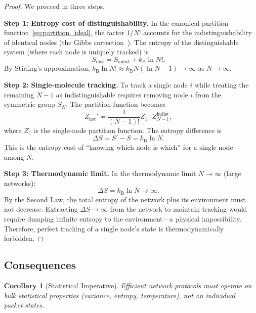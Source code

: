 \documentclass[11pt,twocolumn,a4paper]{article}
\newtheorem{corollary}[theorem]{Corollary}
\theoremstyle{definition}
\theoremstyle{remark}
\newcommand{\kB}{k_{\mathrm{B}}}
\newcommand{\Znet}{Z_{\mathrm{net}}}
\begin{document}
\begin{proof}
We proceed in three steps.

\medskip\noindent\textbf{Step 1: Entropy cost of distinguishability.}
In the canonical partition function~\eqref{eq:partition_ideal}, the factor
$1/N!$ accounts for the indistinguishability of identical nodes (the Gibbs
correction~\cite{Gibbs1902}).  The entropy of the distinguishable system
(where each node is uniquely tracked) is
\begin{equation}\label{eq:s_dist}
  S_{\mathrm{dist}} = S_{\mathrm{indist}} + \kB\ln N!.
\end{equation}
By Stirling's approximation,
$\kB\ln N!\approx\kB N(\ln N-1)\to\infty$ as $N\to\infty$.

\medskip\noindent\textbf{Step 2: Single-molecule tracking.}
To track a single node $i$ while treating the remaining $N-1$ as
indistinguishable requires removing node $i$ from the symmetric group
$S_N$.  The partition function becomes
\[
  \Znet' = \frac{1}{(N-1)!}Z_1\cdot Z_{N-1}^{\mathrm{indist}},
\]
where $Z_1$ is the single-node partition function.  The entropy difference is
\begin{equation}\label{eq:delta_s}
  \Delta S = S'-S = \kB\ln N.
\end{equation}
This is the entropy cost of ``knowing which node is which'' for a single node
among $N$.

\medskip\noindent\textbf{Step 3: Thermodynamic limit.}
In the thermodynamic limit $N\to\infty$ (large networks):
\[
  \Delta S = \kB\ln N \to \infty.
\]
By the Second Law, the total entropy of the network plus its environment
must not decrease.  Extracting $\Delta S\to\infty$ from the network to
maintain tracking would require dumping infinite entropy to the
environment---a physical impossibility.  Therefore, perfect tracking of a
single node's state is thermodynamically forbidden.
\end{proof}

\subsection{Consequences}\label{sec:central_consequences}

\begin{corollary}[Statistical Imperative]\label{cor:statistical}
Efficient network protocols must operate on \emph{bulk statistical properties}
(variance, entropy, temperature), not on individual packet states.
\end{corollary}
\end{document}

